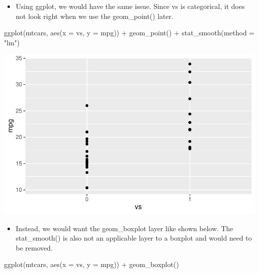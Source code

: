 \documentclass[
  letterpaper,
  DIV=11,
  numbers=noendperiod]{scrreprt}
\newenvironment{Shaded}{\begin{snugshade}}{\end{snugshade}}
\newcommand{\AttributeTok}[1]{\textcolor[rgb]{0.40,0.45,0.13}{#1}}
\newcommand{\FunctionTok}[1]{\textcolor[rgb]{0.28,0.35,0.67}{#1}}
\newcommand{\NormalTok}[1]{\textcolor[rgb]{0.00,0.23,0.31}{#1}}
\newcommand{\SpecialCharTok}[1]{\textcolor[rgb]{0.37,0.37,0.37}{#1}}
\newcommand{\StringTok}[1]{\textcolor[rgb]{0.13,0.47,0.30}{#1}}
\providecommand{\tightlist}{%
  \setlength{\itemsep}{0pt}\setlength{\parskip}{0pt}}\usepackage{longtable,booktabs,array}
\begin{document}
\begin{itemize}
\tightlist
\item
  Using ggplot, we would have the same issue. Since vs is categorical,
  it does not look right when we use the geom\_point() later.
\end{itemize}

\begin{Shaded}
\begin{Highlighting}[]
\FunctionTok{ggplot}\NormalTok{(mtcars, }\FunctionTok{aes}\NormalTok{(}\AttributeTok{x =}\NormalTok{ vs, }\AttributeTok{y =}\NormalTok{ mpg)) }\SpecialCharTok{+} \FunctionTok{geom\_point}\NormalTok{() }\SpecialCharTok{+} \FunctionTok{stat\_smooth}\NormalTok{(}\AttributeTok{method =} \StringTok{"lm"}\NormalTok{)}
\end{Highlighting}
\end{Shaded}

\includegraphics{dataviz_files/figure-pdf/unnamed-chunk-55-1.pdf}

\begin{itemize}
\tightlist
\item
  Instead, we would want the geom\_boxplot layer like shown below. The
  stat\_smooth() is also not an applicable layer to a boxplot and would
  need to be removed.
\end{itemize}

\begin{Shaded}
\begin{Highlighting}[]
\FunctionTok{ggplot}\NormalTok{(mtcars, }\FunctionTok{aes}\NormalTok{(}\AttributeTok{x =}\NormalTok{ vs, }\AttributeTok{y =}\NormalTok{ mpg)) }\SpecialCharTok{+} \FunctionTok{geom\_boxplot}\NormalTok{()}
\end{Highlighting}
\end{Shaded}
\end{document}
